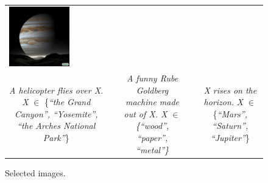 \begin{figure}[ht!]
\begin{adjustwidth}{-0.8in}{-0.5in}
\begin{tabular}{cccccccccccccccccccc}
\multicolumn{2}{c}{\includegraphics[width=\threebythreecolwidth\textwidth]{figures/cherries/jupiter3.jpg}} \\


\multicolumn{6}{p{\thirdcolwidth\textwidth}}{{\tiny \textit{A helicopter flies over X.} \textit{X} $\in$ \{\textit{``the Grand Canyon'', ``Yosemite'', ``the Arches National Park''}\}}} &&
\multicolumn{6}{p{\thirdcolwidth\textwidth}}{{\tiny \textit{A funny Rube Goldberg machine made out of X. \textit{X} $\in$ \{\textit{``wood'', ``paper'', ``metal''}\}}}} &&
\multicolumn{6}{p{\thirdcolwidth\textwidth}}{{\tiny \textit{X rises on the horizon.} \textit{X} $\in$ \{\textit{``Mars'', ``Saturn'', ``Jupiter''}\}}} \\
\end{tabular}
\end{adjustwidth}
\caption{Selected \bdraw images.}
\label{figs:appendix_cherry3}
\end{figure}
